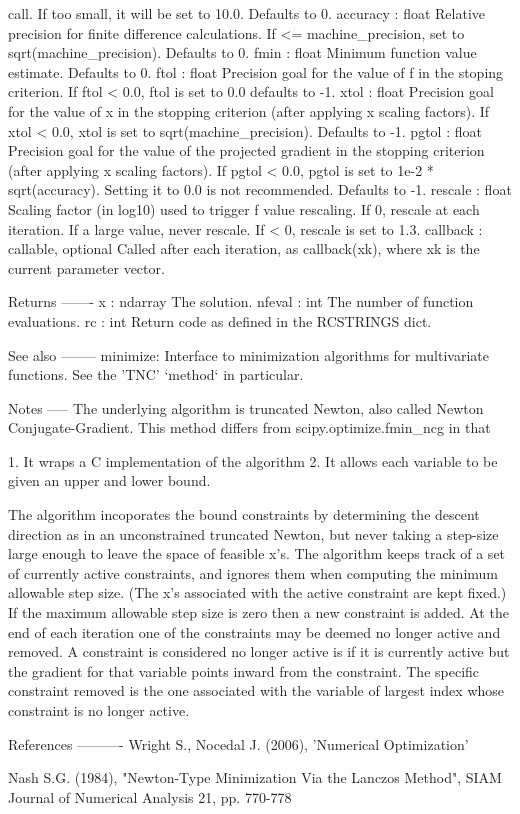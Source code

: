 \begin{DoxyVerb}
    call.  If too small, it will be set to 10.0.  Defaults to 0.
accuracy : float
    Relative precision for finite difference calculations.  If
    <= machine_precision, set to sqrt(machine_precision).
    Defaults to 0.
fmin : float
    Minimum function value estimate.  Defaults to 0.
ftol : float
    Precision goal for the value of f in the stoping criterion.
    If ftol < 0.0, ftol is set to 0.0 defaults to -1.
xtol : float
    Precision goal for the value of x in the stopping
    criterion (after applying x scaling factors).  If xtol <
    0.0, xtol is set to sqrt(machine_precision).  Defaults to
    -1.
pgtol : float
    Precision goal for the value of the projected gradient in
    the stopping criterion (after applying x scaling factors).
    If pgtol < 0.0, pgtol is set to 1e-2 * sqrt(accuracy).
    Setting it to 0.0 is not recommended.  Defaults to -1.
rescale : float
    Scaling factor (in log10) used to trigger f value
    rescaling.  If 0, rescale at each iteration.  If a large
    value, never rescale.  If < 0, rescale is set to 1.3.
callback : callable, optional
    Called after each iteration, as callback(xk), where xk is the
    current parameter vector.

Returns
-------
x : ndarray
    The solution.
nfeval : int
    The number of function evaluations.
rc : int
    Return code as defined in the RCSTRINGS dict.

See also
--------
minimize: Interface to minimization algorithms for multivariate
    functions. See the 'TNC' `method` in particular.

Notes
-----
The underlying algorithm is truncated Newton, also called
Newton Conjugate-Gradient. This method differs from
scipy.optimize.fmin_ncg in that

1. It wraps a C implementation of the algorithm
2. It allows each variable to be given an upper and lower bound.

The algorithm incoporates the bound constraints by determining
the descent direction as in an unconstrained truncated Newton,
but never taking a step-size large enough to leave the space
of feasible x's. The algorithm keeps track of a set of
currently active constraints, and ignores them when computing
the minimum allowable step size. (The x's associated with the
active constraint are kept fixed.) If the maximum allowable
step size is zero then a new constraint is added. At the end
of each iteration one of the constraints may be deemed no
longer active and removed. A constraint is considered
no longer active is if it is currently active
but the gradient for that variable points inward from the
constraint. The specific constraint removed is the one
associated with the variable of largest index whose
constraint is no longer active.

References
----------
Wright S., Nocedal J. (2006), 'Numerical Optimization'

Nash S.G. (1984), "Newton-Type Minimization Via the Lanczos Method",
SIAM Journal of Numerical Analysis 21, pp. 770-778\end{DoxyVerb}
 

